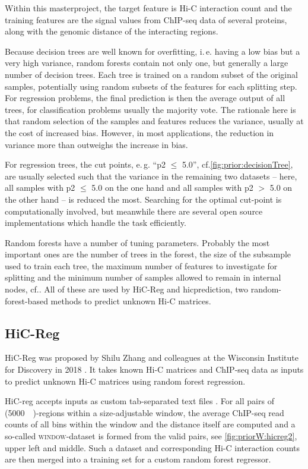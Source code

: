 Within this masterproject, the target feature is Hi-C interaction count
and the training features are the signal values from ChIP-seq data of several proteins,
along with the genomic distance of the interacting regions.

Because decision trees are well known for overfitting, i.\,e. having a low bias but a very high variance,
random forests contain not only one, but generally a large number of decision trees.
Each tree is trained on a random subset of the original samples, potentially using random subsets
of the features for each splitting step.
For regression problems, the final prediction is then the average output of all trees, 
for classification problems usually the majority vote.
The rationale here is that random selection of the samples and features reduces the variance,
usually at the cost of increased bias. 
However, in most applications, the reduction in variance more than outweighs the increase in bias.

For regression trees, the cut points, e.\,g. ``p2 $\leq$ 5.0'', cf.\;\autoref{fig:prior:decisionTree}, 
are usually selected such that the variance in the remaining two datasets -- here, 
all samples with p2 $\leq$ 5.0 on the one hand and all samples with p2 $>$ 5.0 on
the other hand -- is reduced the most.
Searching for the optimal cut-point is computationally involved,
but meanwhile there are several open source implementations which handle the task efficiently.

Random forests have a number of tuning parameters. 
Probably the most important ones are the number of trees in the forest, 
the size of the subsample used to train each tree,
the maximum number of features to investigate for splitting
and the minimum number of samples allowed to remain in internal nodes, cf.\;\cite{scikitEnsemble2019}.
All of these are used by HiC-Reg and hicprediction, two random-forest-based methods
to predict unknown Hi-C matrices.

\subsection{HiC-Reg}
HiC-Reg was proposed by Shilu Zhang and colleagues at the Wisconsin Institute for Discovery in 2018 \cite{Zhang2019, Zhang2018}.
It takes known Hi-C matrices and ChIP-seq data as inputs to predict unknown Hi-C matrices using random forest regression.

HiC-reg accepts inputs as custom tab-separated text files \cite{Roy2020}.
For all pairs of (\SI{5000}{\kilo\bp})-regions within a size-adjustable window, the average
ChIP-seq read counts of all bins within the window and the distance itself 
are computed and a so-called \textsc{window}-dataset is formed from the valid pairs, see \autoref{fig:priorW:hicreg2}, upper left and middle.
Such a dataset and corresponding Hi-C interaction counts are then merged into a training set
for a custom random forest regressor. 

